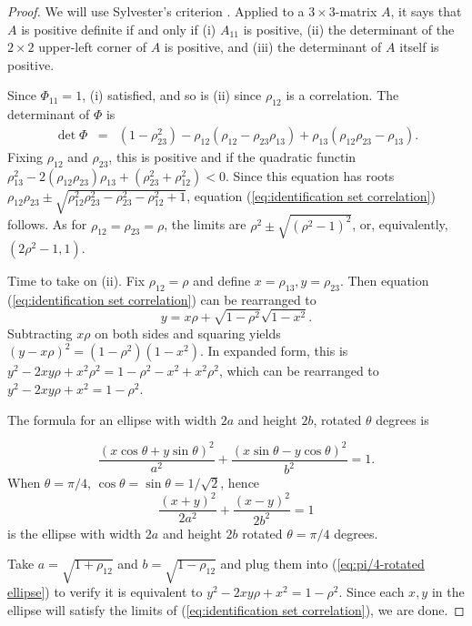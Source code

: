 \begin{proof}
We will use Sylvester's criterion \parencite{Gilbert1991-ch}. Applied
to a $3\times3$-matrix $A$, it says that $A$ is positive definite
if and only if (i) $A_{11}$ is positive, (ii) the determinant of
the $2\times2$ upper-left corner of $A$ is positive, and (iii) the
determinant of $A$ itself is positive. 

Since $\Phi_{11}=1$, (i) satisfied, and so is (ii) since $\rho_{12}$
is a correlation. The determinant of $\Phi$ is
\begin{eqnarray*}
\det\Phi & = & (1-\rho_{23}^{2})-\rho_{12}(\rho_{12}-\rho_{23}\rho_{13})+\rho_{13}(\rho_{12}\rho_{23}-\rho_{13}).
\end{eqnarray*}
Fixing $\rho_{12}$ and $\rho_{23}$, this is positive and if the
quadratic functin $\rho_{13}^{2}-2(\rho_{12}\rho_{23})\rho_{13}+(\rho_{23}^{2}+\rho_{12}^{2})<0$.
Since this equation has roots $\rho_{12}\rho_{23}\pm\sqrt{\rho_{12}^{2}\rho_{23}^{2}-\rho_{23}^{2}-\rho_{12}^{2}+1}$,
equation (\ref{eq:identification set correlation}) follows. As for
$\rho_{12}=\rho_{23}=\rho$, the limits are $\rho^{2}\pm\sqrt{(\rho^{2}-1)^{2}}$,
or, equivalently, $(2\rho^{2}-1,1).$

Time to take on (ii). Fix $\rho_{12}=\rho$ and define $x=\rho_{13},y=\rho_{23}$.
Then equation (\ref{eq:identification set correlation}) can be rearranged
to
\begin{equation}
y=x\rho+\sqrt{1-\rho^{2}}\sqrt{1-x^{2}}.\label{eq:ellipse eq1}
\end{equation}
Subtracting $x\rho$ on both sides and squaring yields $(y-x\rho)^{2}=(1-\rho^{2})(1-x^{2}).$
In expanded form, this is $y^{2}-2xy\rho+x^{2}\rho^{2}=1-\rho^{2}-x^{2}+x^{2}\rho^{2}$,
which can be rearranged to $y^{2}-2xy\rho+x^{2}=1-\rho^{2}$. 

The formula for an ellipse with width $2a$ and height $2b$, rotated
$\theta$ degrees is

\[
\frac{(x\cos\theta+y\sin\theta)^{2}}{a^{2}}+\frac{(x\sin\theta-y\cos\theta)^{2}}{b^{2}}=1.
\]
When $\theta=\pi/4$, $\cos\theta=\sin\theta=1/\sqrt{2}$, hence 
\begin{equation}
\frac{(x+y)^{2}}{2a^{2}}+\frac{(x-y)^{2}}{2b^{2}}=1\label{eq:pi/4-rotated ellipse}
\end{equation}
is the ellipse with width $2a$ and height $2b$ rotated $\theta=\pi/4$
degrees.

Take $a=\sqrt{1+\rho_{12}}$ and $b=\sqrt{1-\rho_{12}}$ and plug
them into (\ref{eq:pi/4-rotated ellipse}) to verify it is equivalent
to $y^{2}-2xy\rho+x^{2}=1-\rho^{2}$. Since each $x,y$ in the ellipse
will satisfy the limits of (\ref{eq:identification set correlation}),
we are done.
\end{proof}
